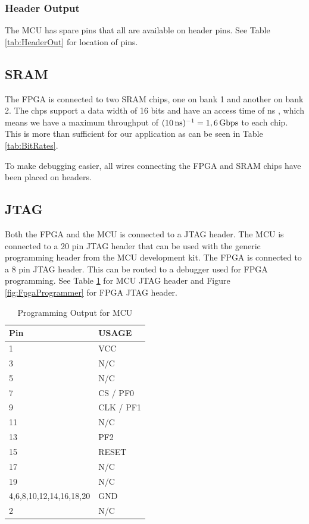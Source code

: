 \subsubsection{Header Output}
The MCU has spare pins that all are available on header pins.
See Table \ref{tab:HeaderOut} for location of pins.

\subsection{SRAM}
\label{subsec:sram}
The FPGA is connected to two SRAM chips, one on bank 1 and another on bank 2.
The chps support a data width of 16 bits and have an access time of \unit[10]{ns} \cite{sramdatasheet}, which means we have a maximum throughput of $(\unit[10]{ns})^{-1} = \unit[1,6]{Gbps}$ to each chip.
This is more than sufficient for our application as can be seen in Table \ref{tab:BitRates}.

To make debugging easier, all wires connecting the FPGA and SRAM chips have been placed on headers.

\subsection{JTAG}
Both the FPGA and the MCU is connected to a JTAG header.
The MCU is connected to a 20 pin JTAG header that can be used with the generic programming header from the MCU development kit.
The FPGA is connected to a 8 pin JTAG header.
This can be routed to a debugger used for FPGA programming.
See Table \ref{tab:EfmProgrammer} for MCU JTAG header and Figure \ref{fig:FpgaProgrammer} for FPGA JTAG header.

\begin{table}[]
    \centering
    \begin{tabular}{ll}
        Pin                     & USAGE     \\
        \hline
        1                       & VCC       \\
        3                       & N/C       \\
        5                       & N/C       \\
        7                       & CS / PF0  \\
        9                       & CLK / PF1 \\
        11                      & N/C       \\
        13                      & PF2       \\
        15                      & RESET     \\
        17                      & N/C       \\
        19                      & N/C       \\
        4,6,8,10,12,14,16,18,20 & GND       \\
        2                       & N/C
    \end{tabular}
    \caption{Programming Output for MCU}
    \label{tab:EfmProgrammer}
\end{table}

